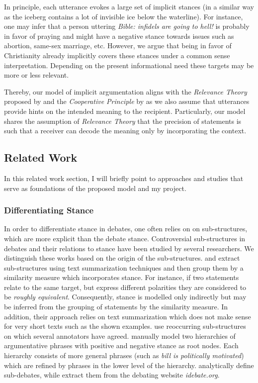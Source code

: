 \documentclass[11pt]{article}
\begin{document}
In principle, each utterance evokes a large set of implicit stances (in a similar way as the iceberg contains a lot of invisible ice below the waterline). 
For instance, one may infer that a person uttering \textit{Bible: infidels are going to hell!} is probably in favor of praying and might have a negative stance towards issues such as abortion, same-sex marriage, etc. 
However, we argue that being in favor of Christianity already implicitly covers these stances under a common sense interpretation. 
Depending on the present informational need these targets may be more or less relevant.

Thereby, our model of implicit argumentation aligns with the \textit{Relevance Theory} proposed by  and the \textit{Cooperative Principle} by  as we also assume that utterances provide hints on the intended meaning to the recipient. Particularly, our model shares the assumption of \textit{Relevance Theory} that the precision of statements is such that a receiver can decode the meaning only by incorporating the context.

\subsection{Related Work}
In this related work section, I will briefly point to approaches and studies that serve as foundations of the proposed model and my project. 

\subsubsection{Differentiating Stance}
\label{sec:linkingStance}
In order to differentiate stance in debates, one often relies on on sub-structures, which are more explicit than the debate stance.
Controversial sub-structures in debates and their relations to stance have been studied by several researchers. 
We distinguish these works based on the origin of the sub-structures.
 and  extract sub-structures using text summarization techniques and then group them by a similarity measure which incorporates stance.
For instance, if two statements relate to the same target, but express different polarities they are considered to be \textit{roughly equivalent}.
Consequently, stance is modelled only indirectly but may be inferred from the grouping of statements by the similarity measure.
In addition, their approach relies on text summarization which does not make sense for very short texts such as the shown examples.
 use reoccurring sub-structures on which several annotators have agreed.
 manually model two hierarchies of argumentative phrases with positive and negative stance as root nodes.
Each hierarchy consists of more general phrases (such as \textit{bill is politically motivated}) which are refined by phrases in the lower level of the hierarchy.
 analytically define sub-debates, while  extract them from the debating website \textit{\mbox{idebate.org}}.
\end{document}
